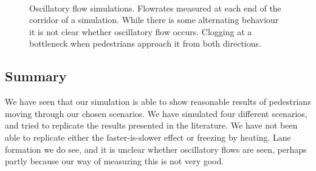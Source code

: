\begin{figure}[h]
    \centering
    \\
    
    \caption[Oscillatory flow simulations]{Oscillatory flow simulations. 
     Flowrates measured at each end of the corridor 
    of a simulation. While there is some alternating behaviour it is not clear 
    whether oscillatory flow occurs.  Clogging at a 
    bottleneck when pedestrians approach it from both directions.}
    \label{fig:oscillatory-flow}
\end{figure}

\subsection{Summary}
We have seen that our simulation is able to show reasonable results of 
pedestrians moving through our chosen scenarios. We have simulated four 
different scenarios, and tried to replicate the results presented in the 
literature. We have not been able to replicate either the faster-is-slower 
effect or freezing by heating. Lane formation we do see, and it is unclear 
whether oscillatory flows are seen, perhaps partly because our way of 
measuring this is not very good.
